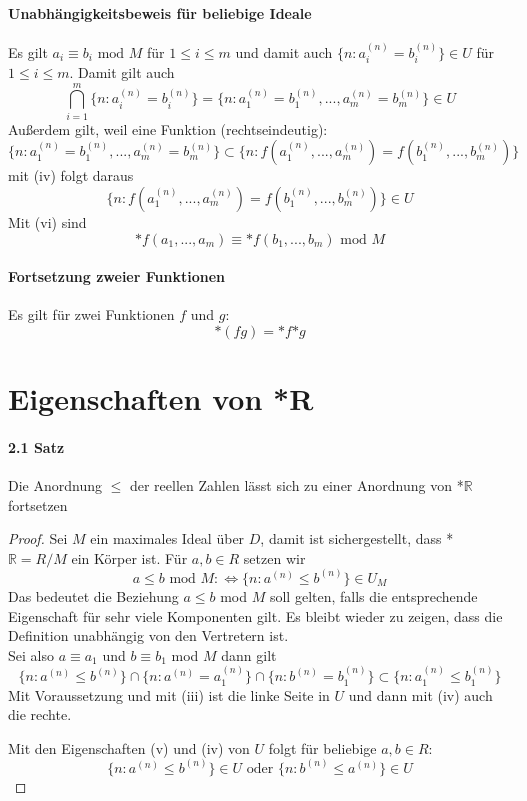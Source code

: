 \documentclass[a4paper]{article}
\begin{document}
\paragraph{Unabhängigkeitsbeweis für beliebige Ideale}
Es gilt $ a_i \equiv b_i \text{ mod } M $ für $ 1 \leqslant i \leqslant m $ und damit auch $ \{n: a^{(n)}_i = b^{(n)}_i\} \in U $ für 
$ 1 \leqslant i \leqslant m $. Damit gilt auch
$$ \bigcap_{i = 1}^m \{n: a^{(n)}_i = b^{(n)}_i\} = \{n: a^{(n)}_1 = b^{(n)}_1,...,a^{(n)}_m = b^{(n)}_m\} \in U $$
Außerdem gilt, weil eine Funktion (rechtseindeutig): 
$$ \{n: a^{(n)}_1 = b^{(n)}_1,...,a^{(n)}_m = b^{(n)}_m\} \subset \{n: f(a^{(n)}_1,...,a^{(n)}_m) = f(b^{(n)}_1,...,b^{(n)}_m)\} $$
mit (iv) folgt daraus
$$ \{n: f(a^{(n)}_1,...,a^{(n)}_m) = f(b^{(n)}_1,...,b^{(n)}_m)\} \in U $$ 
Mit (vi) sind 
$$ \text{*}f(a_1,...,a_m) \equiv \text{*}f(b_1,...,b_m) \text{ mod } M $$ 


\paragraph{Fortsetzung zweier Funktionen}
Es gilt für zwei Funktionen $ f $ und $ g $:
$$ \text{*}(f g) = \text{*}f \text{*}g$$
\section{Eigenschaften von *R}

\paragraph{2.1 Satz} Die Anordnung $\leqslant$ der reellen Zahlen lässt 
sich zu einer Anordnung von *$\mathbb{R}$ fortsetzen
\begin{proof}
      Sei $ M $ ein maximales Ideal über $ D $, damit ist sichergestellt, dass *$\mathbb{R} = R/M $ ein Körper ist.
      Für $ a,b \in R $ setzen wir 
      $$ a \leqslant b \text{ mod } M :\iff \{n: a^{(n)} \leqslant b^{(n)}\} \in U_M $$ 
      Das bedeutet die Beziehung $ a\leqslant b $ mod $ M $ soll gelten, falls die entsprechende Eigenschaft
      für sehr viele Komponenten gilt. 
      Es bleibt wieder zu zeigen, dass die Definition unabhängig von den Vertretern ist. \\
      Sei also $ a \equiv a_1 $ und $ b \equiv b_1 $ mod $ M $ dann gilt 
      $$ \{n: a^{(n)} \leqslant b^{(n)}\} \cap \{n: a^{(n)} = a^{(n)}_1\} \cap \{n: b^{(n)} = b^{(n)}_1\} \subset \{n: a^{(n)}_1 \leqslant b^{(n)}_1\} $$
      Mit Voraussetzung und mit (iii) ist die linke Seite in $ U $ und dann mit (iv) auch die rechte.

      \bigskip
      Mit den Eigenschaften (v) und (iv) von $ U $ folgt für beliebige $ a,b \in R: $
      $$ \{n: a^{(n)} \leqslant b^{(n)}\} \in U \text{ oder } \{n: b^{(n)} \leqslant a^{(n)}\} \in U $$
\end{proof}
\end{document}
